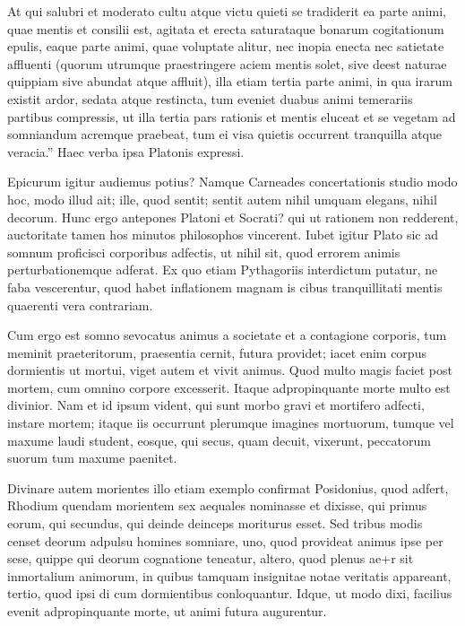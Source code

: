  At qui salubri et moderato cultu atque victu quieti se tradiderit ea parte animi, quae mentis et consilii est, agitata et erecta saturataque bonarum cogitationum epulis, eaque parte animi, quae voluptate alitur, nec inopia enecta nec satietate affluenti (quorum utrumque praestringere aciem mentis solet, sive deest naturae quippiam sive abundat atque affluit), illa etiam tertia parte animi, in qua irarum existit ardor, sedata atque restincta, tum eveniet duabus animi temerariis partibus compressis, ut illa tertia pars rationis et mentis eluceat et se vegetam ad somniandum acremque praebeat, tum ei visa quietis occurrent tranquilla atque veracia.'' Haec verba ipsa Platonis expressi.

 Epicurum igitur audiemus potius? Namque Carneades concertationis studio modo hoc, modo illud ait; ille, quod sentit; sentit autem nihil umquam elegans, nihil decorum. Hunc ergo antepones Platoni et Socrati? qui ut rationem non redderent, auctoritate tamen hos minutos philosophos vincerent. Iubet igitur Plato sic ad somnum proficisci corporibus adfectis, ut nihil sit, quod errorem animis perturbationemque adferat. Ex quo etiam Pythagoriis interdictum putatur, ne faba vescerentur, quod habet inflationem magnam is cibus tranquillitati mentis quaerenti vera contrariam.

 Cum ergo est somno sevocatus animus a societate et a contagione corporis, tum meminit praeteritorum, praesentia cernit, futura providet; iacet enim corpus dormientis ut mortui, viget autem et vivit animus. Quod multo magis faciet post mortem, cum omnino corpore excesserit. Itaque adpropinquante morte multo est divinior. Nam et id ipsum vident, qui sunt morbo gravi et mortifero adfecti, instare mortem; itaque iis occurrunt plerumque imagines mortuorum, tumque vel maxume laudi student, eosque, qui secus, quam decuit, vixerunt, peccatorum suorum tum maxume paenitet.

 Divinare autem morientes illo etiam exemplo confirmat Posidonius, quod adfert, Rhodium quendam morientem sex aequales nominasse et dixisse, qui primus eorum, qui secundus, qui deinde deinceps moriturus esset. Sed tribus modis censet deorum adpulsu homines somniare, uno, quod provideat animus ipse per sese, quippe qui deorum cognatione teneatur, altero, quod plenus ae+r sit inmortalium animorum, in quibus tamquam insignitae notae veritatis appareant, tertio, quod ipsi di cum dormientibus conloquantur. Idque, ut modo dixi, facilius evenit adpropinquante morte, ut animi futura augurentur.

